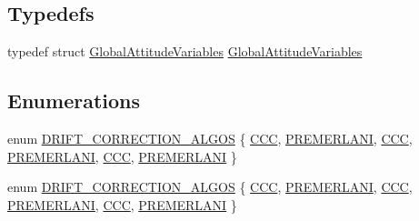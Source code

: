 \subsection*{\-Typedefs}
\begin{DoxyCompactItemize}
\item 
typedef struct \*
\hyperlink{struct_global_attitude_variables}{\-Global\-Attitude\-Variables} \hyperlink{group___state_estimation_filters_ga02f6c6dfdf0ff8ff2b30b24205c6b1f8}{\-Global\-Attitude\-Variables}
\end{DoxyCompactItemize}
\subsection*{\-Enumerations}
\begin{DoxyCompactItemize}
\item 
enum \hyperlink{group___state_estimation_filters_ga0c4491990a84594e2c930826b64b725c}{\-D\-R\-I\-F\-T\-\_\-\-C\-O\-R\-R\-E\-C\-T\-I\-O\-N\-\_\-\-A\-L\-G\-O\-S} \{ \*
\hyperlink{group___c_c_state_gga0c4491990a84594e2c930826b64b725ca34fecf46a591d355d8d76d32e4b5d469}{\-C\-C\-C}, 
\hyperlink{group___c_c_state_gga0c4491990a84594e2c930826b64b725ca7f012e6cc49436cc18a3204777eb9834}{\-P\-R\-E\-M\-E\-R\-L\-A\-N\-I}, 
\hyperlink{group___c_c_state_gga0c4491990a84594e2c930826b64b725ca34fecf46a591d355d8d76d32e4b5d469}{\-C\-C\-C}, 
\hyperlink{group___c_c_state_gga0c4491990a84594e2c930826b64b725ca7f012e6cc49436cc18a3204777eb9834}{\-P\-R\-E\-M\-E\-R\-L\-A\-N\-I}, 
\*
\hyperlink{group___c_c_state_gga0c4491990a84594e2c930826b64b725ca34fecf46a591d355d8d76d32e4b5d469}{\-C\-C\-C}, 
\hyperlink{group___c_c_state_gga0c4491990a84594e2c930826b64b725ca7f012e6cc49436cc18a3204777eb9834}{\-P\-R\-E\-M\-E\-R\-L\-A\-N\-I}
 \}
\item 
enum \hyperlink{group___state_estimation_filters_ga0c4491990a84594e2c930826b64b725c}{\-D\-R\-I\-F\-T\-\_\-\-C\-O\-R\-R\-E\-C\-T\-I\-O\-N\-\_\-\-A\-L\-G\-O\-S} \{ \*
\hyperlink{group___c_c_state_gga0c4491990a84594e2c930826b64b725ca34fecf46a591d355d8d76d32e4b5d469}{\-C\-C\-C}, 
\hyperlink{group___c_c_state_gga0c4491990a84594e2c930826b64b725ca7f012e6cc49436cc18a3204777eb9834}{\-P\-R\-E\-M\-E\-R\-L\-A\-N\-I}, 
\hyperlink{group___c_c_state_gga0c4491990a84594e2c930826b64b725ca34fecf46a591d355d8d76d32e4b5d469}{\-C\-C\-C}, 
\hyperlink{group___c_c_state_gga0c4491990a84594e2c930826b64b725ca7f012e6cc49436cc18a3204777eb9834}{\-P\-R\-E\-M\-E\-R\-L\-A\-N\-I}, 
\*
\hyperlink{group___c_c_state_gga0c4491990a84594e2c930826b64b725ca34fecf46a591d355d8d76d32e4b5d469}{\-C\-C\-C}, 
\hyperlink{group___c_c_state_gga0c4491990a84594e2c930826b64b725ca7f012e6cc49436cc18a3204777eb9834}{\-P\-R\-E\-M\-E\-R\-L\-A\-N\-I}
 \}
\end{DoxyCompactItemize}

